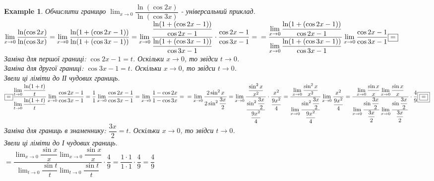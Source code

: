 \documentclass[a4paper, 14pt]{article}
\def\huge{\displaystyle}
\theoremstyle{theoremdd}
\theoremstyle{theoremdd}
\theoremstyle{theoremdd}
\theoremstyle{theoremdd}
\newtheorem{example}[theorem]{Example}
\theoremstyle{theoremdd}
\theoremstyle{theoremdd}
\theoremstyle{theoremdd}
\theoremstyle{theoremdd}
\begin{document}
\begin{example}
Обчислити границю $\huge\lim_{x \to 0} \dfrac{\ln (\cos 2x)}{\ln (\cos 3x)}$ - універсальний приклад.\\
$\huge\lim_{x \to 0} \dfrac{\ln (\cos 2x)}{\ln (\cos 3x)} = \lim_{x \to 0} \dfrac{\ln (1 + (\cos 2x - 1))}{\ln (1 + (\cos 3x - 1))} = \lim_{x \to 0} \dfrac{\dfrac{\ln (1 + (\cos 2x - 1))}{\cos 2x - 1}}{\dfrac{\ln (1 + (\cos 3x - 1))}{\cos 3x - 1}} \cdot \dfrac{\cos 2x -1}{\cos 3x - 1} = \\ = \dfrac{\huge \lim_{x \to 0} \dfrac{\ln (1 + (\cos 2x - 1))}{\cos 2x - 1}}{\huge \lim_{x \to 0} \dfrac{\ln (1 + (\cos 3x - 1))}{\cos 3x - 1}} \lim_{x \to 0} \dfrac{\cos 2x -1}{\cos 3x - 1} \boxed{=}$\\
Заміна для першої границі: $\cos 2x - 1 = t$. Оскільки $x \to 0$, то звідси $t \to 0$.\\
Заміна для другої границі: $\cos 3x - 1 = t$. Оскільки $x \to 0$, то звідси $t \to 0$.\\
Звели ці ліміти до ІІ чудових границь.\\
$\boxed{=} \huge \dfrac{\huge\lim_{t \to 0} \dfrac{\ln (1+t)}{t}}{\huge \lim_{t \to 0} \dfrac{\ln(1+t)}{t}} \lim_{x \to 0} \dfrac{\cos 2x -1}{\cos 3x - 1} = \dfrac{1}{1} \lim_{x \to 0} \dfrac{\cos 2x -1}{\cos 3x - 1} = \lim_{x \to 0} \dfrac{1 - \cos 2x}{1 - \cos 3x} = \\ = \lim_{x \to 0} \dfrac{2 \sin^2 x}{2 \sin^2 \dfrac{3x}{2}} = \lim_{x \to 0} \dfrac{\dfrac{\sin^2 x}{x^2}}{\dfrac{\sin^2 \dfrac{3x}{2}}{\dfrac{9x^2}{4}}} \cdot \dfrac{x^2}{\dfrac{9x^2}{4}} = \dfrac{\huge \lim_{x \to 0} \dfrac{\sin^2 x}{x^2}}{\huge \lim_{x \to 0} \dfrac{\sin^2 \dfrac{3x}{2}}{\dfrac{9x^2}{4}}} \huge\lim_{x \to 0} \dfrac{x^2}{\dfrac{9x^2}{4}} = \dfrac{\huge \lim_{x \to 0} \dfrac{\sin x}{x} \lim_{x \to 0} \dfrac{\sin x}{x}}{\huge \lim_{x \to 0} \dfrac{\sin \dfrac{3x}{2}}{\dfrac{3x}{2}} \lim_{x \to 0} \dfrac{\sin \dfrac{3x}{2}}{\dfrac{3x}{2}}} \cdot \dfrac{4}{9} \boxed{\boxed{=}}$\\
Заміна для границь в знаменнику: $\dfrac{3x}{2} = t$. Оскільки $x \to 0$, то звідси $t \to 0$.\\
Звели ці ліміти до І чудових границь.\\
$\boxed{\boxed{=}} \dfrac{\huge \lim_{x \to 0} \dfrac{\sin x}{x} \lim_{x \to 0} \dfrac{\sin x}{x}}{\huge \lim_{t \to 0} \dfrac{\sin t}{t} \lim_{t \to 0} \dfrac{\sin t}{t}} \cdot \dfrac{4}{9} = \dfrac{1 \cdot 1}{1 \cdot 1} \cdot \dfrac{4}{9} = \dfrac{4}{9}$
\end{example}
\end{document}
